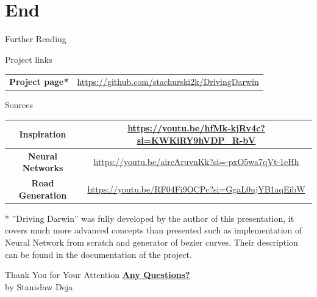 \documentclass{beamer}
\begin{document}
\section{End}
\begin{frame}{Further Reading}
    \begin{block}{Project links}
        \begin{tabular}{c|c}
           \textbf{\footnotesize{Project page* }}&\footnotesize{ \url{https://github.com/stachurski2k/DrivingDarwin}}
        \end{tabular}
    \end{block}
    \begin{block}{Sources}
        \begin{tabular}{c|c}
\textbf{\scriptsize{Inspiration}} & \scriptsize{ \url{https://youtu.be/hfMk-kjRv4c?si=KWKiRY9hVDP_R-bV}}\\
\hline
\textbf{\scriptsize{Neural Networks}} & \scriptsize{ \url{https://youtu.be/aircAruvnKk?si=-pxO5wa7qVt-1eHh}}\\
\hline
\textbf{\scriptsize{Road Generation}}& \scriptsize{ \url{https://youtu.be/RF04Fi9OCPc?si=GgaL0ujYB1aqEibW}}\\
        \end{tabular}
    \end{block}
    \footnotesize{
    * ”Driving Darwin” was fully developed by the author of this presentation, it covers
    much more advanced concepts than presented such as implementation of Neural
    Network from scratch and generator of bezier curves. Their description can be found
    in the documentation of the project.}
\end{frame}

\begin{frame}{Thank You for Your Attention}
    \centering
    \textbf{\underline{\Huge{Any Questions?}}}\\
    by Stanisław Deja
\end{frame}
\end{document}
